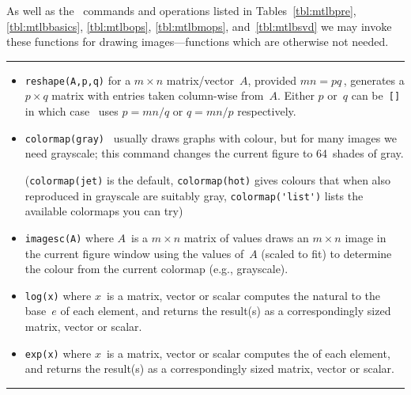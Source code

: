 \begin{table}
\caption{As well as the \script\ commands and operations listed in Tables~\ref{tbl:mtlbpre}, \ref{tbl:mtlbbasics}, \ref{tbl:mtlbops}, \ref{tbl:mtlbmops}, and~\ref{tbl:mtlbsvd}  we may invoke these functions for drawing images---functions which are otherwise not needed.} \label{tbl:mtlbimag}
\hrule
\begin{minipage}{\linewidth}
\begin{itemize}

\item {}\verb|reshape(A,p,q)| for a \(m\times n\) matrix\slash vector~\(A\), provided \(mn=pq\)\,, generates a \(p\times q\) matrix with entries taken column-wise from~\(A\).  
Either \(p\) or~\(q\) can be~\verb|[]| in which case \script\ uses \(p=mn/q\) or \(q=mn/p\) respectively.

\item {}\verb|colormap(gray)| \script\ usually draws graphs with colour, but for many images we need grayscale; this command changes the current figure to 64~shades of gray.  

(\verb|colormap(jet)| is the default, \verb|colormap(hot)| gives colours that when also reproduced in grayscale are suitably gray, \verb|colormap('list')| lists the available colormaps you can try)

\item {}\verb|imagesc(A)| where \(A\)~is a \(m\times n\) matrix of values draws an \(m\times n\) image in the current figure window using the values of~\(A\) (scaled to fit) to determine the colour from the current colormap (e.g., grayscale).

\item {}\verb|log(x)| where \(x\)~is a  matrix, vector or scalar computes the natural  to the base~\(e\) of each element, and returns the result(s) as a correspondingly sized matrix, vector or scalar.

\item {}\verb|exp(x)| where \(x\)~is a  matrix, vector or scalar computes the  of each element, and returns the result(s) as a correspondingly sized matrix, vector or scalar.

\end{itemize}
\end{minipage}
\hrule
\end{table}









